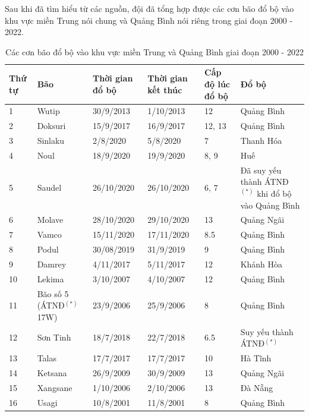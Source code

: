 \documentclass[12pt]{report}
\begin{document}
\begin{flushleft}
	Sau khi đã tìm hiểu từ các nguồn, đội đã tổng hợp được các cơn bão đổ bộ vào khu vực miền Trung nói chung và Quảng Bình nói riêng trong giai đoạn 2000 - 2022.
	\\[\baselineskip]

	\begin{table}[!ht]
		\captionsetup{justification = centering}
		\caption{Các cơn bão đổ bộ vào khu vực miền Trung và Quảng Bình giai đoạn 2000 - 2022}
		\begin{adjustbox}{width = 1.2\linewidth, center}
		\begin{tabular}{|l|l|l|l|l|l|}
		\hline
			Thứ tự & Bão & Thời gian đổ bộ & Thời gian kết thúc & Cấp độ lúc đổ bộ & Đổ bộ \\ \hline
			1 & Wutip & 30/9/2013 & 1/10/2013 & 12 & Quảng Bình \\ \hline
			2 & Doksuri & 15/9/2017 & 16/9/2017 & 12, 13 & Quảng Bình \\ \hline
			3 & Sinlaku & 2/8/2020 & 5/8/2020 & 7 & Thanh Hóa \\ \hline
			4 & Noul & 18/9/2020 & 19/9/2020 & 8, 9 & Huế \\ \hline
			5 & Saudel & 26/10/2020 & 26/10/2020 & 6, 7 & Đã suy yếu thành ÁTNĐ$^{(*)}$ khi đổ bộ vào Quảng Bình \\ \hline
			6 & Molave & 28/10/2020 & 29/10/2020 & 13 & Quảng Ngãi \\ \hline
			7 & Vamco & 15/11/2020 & 17/11/2020 & 8.5 & Quảng Bình \\ \hline
			8 & Podul & 30/08/2019 & 31/9/2019 & 9 & Quảng Bình \\ \hline
			9 & Damrey & 4/11/2017 & 5/11/2017 & 12 & Khánh Hòa \\ \hline
			10 & Lekima & 3/10/2007 & 4/10/2007 & 12 & Quảng Bình \\ \hline
			11 & Bão số 5 (ÁTNĐ$^{(*)}$ 17W) & 23/9/2006 & 25/9/2006 & 8 & Quảng Bình \\ \hline
			12 & Sơn Tinh & 18/7/2018 & 22/7/2018 & 6.5 & Suy yếu thành ÁTNĐ$^{(*)}$ \\ \hline
			13 & Talas & 17/7/2017 & 17/7/2017 & 10 & Hà Tĩnh \\ \hline
			14 & Ketsana & 26/9/2009 & 30/9/2009 & 13 & Quảng Ngãi \\ \hline
			15 & Xangsane & 1/10/2006 & 2/10/2006 & 13 & Đà Nẵng \\ \hline
			16 & Usagi & 10/8/2001 & 11/8/2001 & 8 & Quảng Bình \\ \hline

\end{tabular}
\end{adjustbox}
\end{table}
\end{flushleft}
\end{document}
